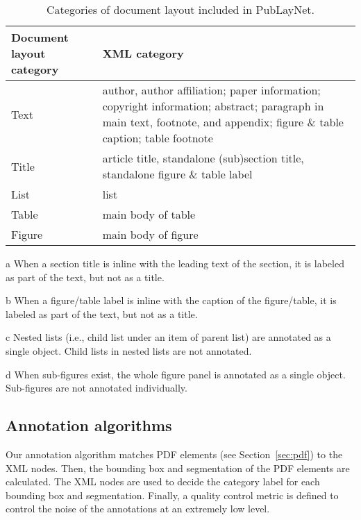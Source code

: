 \documentclass[conference]{IEEEtran}
\begin{document}
\begin{table}[!htb]
  \caption{Categories of document layout included in PubLayNet.}
  \label{tab:category}
  \centering
  \begin{threeparttable}
  \begin{tabular}{p{2cm}p{5.5cm}}
    \toprule
    Document layout category & XML category \\
    \midrule
    Text & author, author affiliation; paper information; copyright information; abstract; paragraph in main text, footnote, and appendix; figure \& table caption; table footnote\\
    Title & article title, standalone (sub)section title\tnote{a}, standalone figure \& table label\tnote{b} \\
    List & list\tnote{c} \\
    Table & main body of table \\
    Figure & main body of figure\tnote{d} \\
    \bottomrule
  \end{tabular}
  \begin{tablenotes}\footnotesize
  \item[a] When a section title is inline with the leading text of the section, it is labeled as part of the text, but not as a title.
  \item[b] When a figure/table label is inline with the caption of the figure/table, it is labeled as part of the text, but not as a title.
  \item[c] Nested lists (i.e., child list under an item of parent list) are annotated as a single object. Child lists in nested lists are not annotated.
  \item[d] When sub-figures exist, the whole figure panel is annotated as a single object. Sub-figures are not annotated individually.
  \end{tablenotes}
  \end{threeparttable}
\end{table}

\subsection{Annotation algorithms}

Our annotation algorithm matches PDF elements (see Section~\ref{sec:pdf}) to the XML nodes. Then, the bounding box and segmentation of the PDF elements are calculated. The XML nodes are used to decide the category label for each bounding box and segmentation. Finally, a quality control metric is defined to control the noise of the annotations at an extremely low level.
\end{document}
